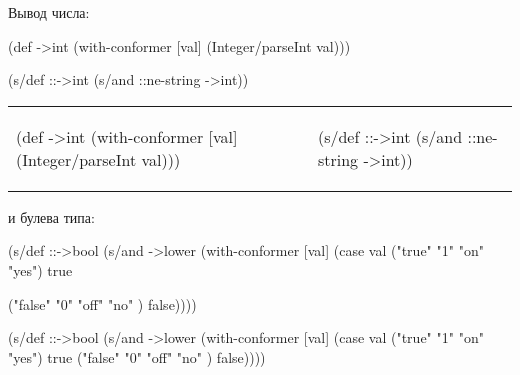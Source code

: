 \noindent

Вывод числа:

\ifx\DEVICETYPE\MOBILE

\begin{english}
  \begin{clojure}
(def ->int
  (with-conformer [val]
    (Integer/parseInt val)))
  \end{clojure}

\splitter

  \begin{clojure}
(s/def ::->int
  (s/and ::ne-string
         ->int))
  \end{clojure}
\end{english}

\else

\begin{english}

\noindent
\begin{tabular}{ @{}p{5cm} @{}p{5cm} }

  \begin{clojure}
(def ->int
  (with-conformer [val]
    (Integer/parseInt val)))
  \end{clojure}

&

  \begin{clojure}
(s/def ::->int
  (s/and ::ne-string
         ->int))
  \end{clojure}

\end{tabular}

\end{english}

\fi

\noindent
и булева типа:

\ifx\DEVICETYPE\MOBILE

\begin{english}
  \begin{clojure}
(s/def ::->bool
  (s/and
   ->lower
   (with-conformer [val]
     (case val
       ("true"  "1" "on"  "yes")
       true

       ("false" "0" "off" "no" )
       false))))
  \end{clojure}
\end{english}

\else

\begin{english}
  \begin{clojure}
(s/def ::->bool
  (s/and
   ->lower
   (with-conformer [val]
     (case val
       ("true"  "1" "on"  "yes") true
       ("false" "0" "off" "no" ) false))))
  \end{clojure}
\end{english}

